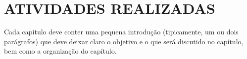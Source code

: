 
\chapter{ATIVIDADES REALIZADAS}
\label{chap:atividades-realizadas}
Cada capítulo deve conter uma pequena introdução (tipicamente, um ou dois parágrafos) que deve deixar claro o objetivo e o que será discutido no capítulo, bem como a organização do capítulo.
